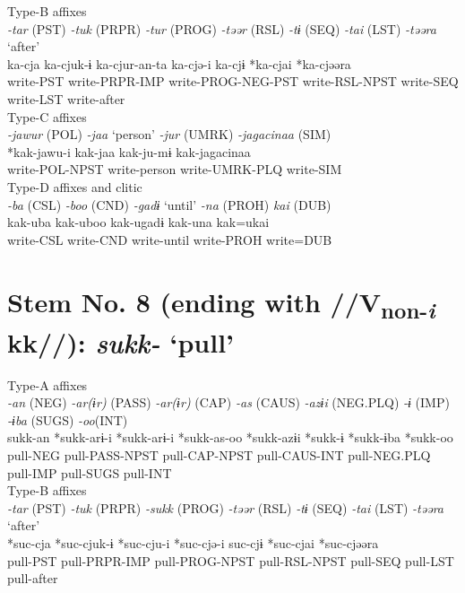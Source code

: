 \ex Type-B affixes\\
\glll \textit{-tar} (PST)  \textit{-tuk} (PRPR)  \textit{-tur} (PROG)  \textit{-təər} (RSL)  \textit{-tɨ} (SEQ)  \textit{-tai} (LST)  \textit{-təəra} ‘after’\\
ka-cja  ka-cjuk-ɨ  ka-cjur-an-ta  ka-cjə-i  ka-cjɨ  *ka-cjai  *ka-cjəəra\\
write-PST  write-PRPR-IMP  write-PROG-NEG-PST  write-RSL-NPST  write-SEQ  write-LST  write-after\\


\ex Type-C affixes\\
\glll \textit{-jawur} (POL)  \textit{-jaa} ‘person’  \textit{-jur} (UMRK)  \textit{-jagacinaa} (SIM)\\
*kak-jawu-i  kak-jaa  kak-ju-mɨ  kak-jagacinaa\\
write-POL-NPST  write-person  write-UMRK-PLQ  write-SIM\\


\ex Type-D affixes and clitic\\
\glll \textit{-ba} (CSL)  \textit{-boo} (CND)  \textit{-gadɨ} ‘until’  \textit{-na} (PROH)  \textit{kai} (DUB)\\
kak-uba  kak-uboo  kak-ugadɨ  kak-una  kak=ukai\\
write-CSL  write-CND  write-until  write-PROH  write=DUB\\
\z

\section{Stem No. 8 (ending with //V\textsubscript{non-}\textit{\textsubscript{i} }kk//): \textit{sukk-} ‘pull’}

\ea Type-A affixes\\
\glll \textit{-an} (NEG)  \textit{-ar(ɨr)} (PASS)  \textit{-ar(ɨr)} (CAP)  \textit{-as} (CAUS)  \textit{-azɨi} (NEG.PLQ)  \textit{-ɨ} (IMP)  \textit{-ɨba} (SUGS)  \textit{-oo}(INT)\\
sukk-an  *sukk-arɨ-i  *sukk-arɨ-i  *sukk-as-oo  *sukk-azɨi  *sukk-ɨ  *sukk-ɨba  *sukk-oo\\
pull-NEG  pull-PASS-NPST  pull-CAP-NPST  pull-CAUS-INT  pull-NEG.PLQ  pull-IMP  pull-SUGS  pull-INT\\


\ex Type-B affixes\\
\glll \textit{-tar} (PST)  \textit{-tuk} (PRPR)  \textit{-sukk} (PROG)  \textit{-təər} (RSL)  \textit{-tɨ} (SEQ)  \textit{-tai} (LST)  \textit{-təəra} ‘after’\\
*suc-cja  *suc-cjuk-ɨ  *suc-cju-i  *suc-cjə-i  suc-cjɨ  *suc-cjai  *suc-cjəəra\\
pull-PST  pull-PRPR-IMP  pull-PROG-NPST  pull-RSL-NPST  pull-SEQ  pull-LST  pull-after\\


